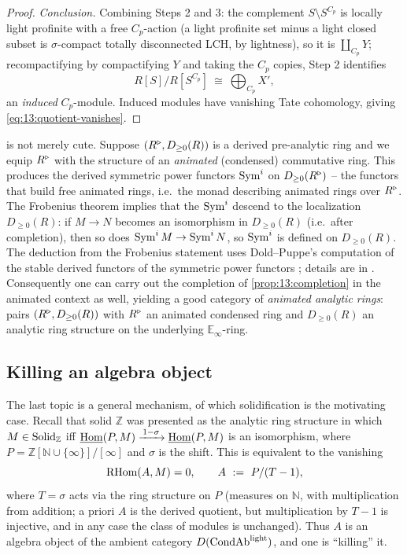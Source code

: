 \begin{proof}
\emph{Conclusion.} Combining Steps 2 and 3: the complement $S\setminus S^{C_p}$ is
locally light profinite with a free $C_p$-action (a light profinite set minus a
light closed subset is $\sigma$-compact totally disconnected LCH, by lightness),
so it is $\coprod_{C_p}Y$; recompactifying by compactifying $Y$ and taking the
$C_p$ copies, Step 2 identifies
\begin{equation*}
R[S]\big/R[S^{C_p}]\ \cong\ \bigoplus_{C_p} X',
\end{equation*}
an \emph{induced} $C_p$-module. Induced modules have vanishing Tate cohomology,
giving \eqref{eq:13:quotient-vanishes}.
\end{proof}

\begin{remark}
\label{rmk:13:symmetric-powers}
 is not merely cute. Suppose $(R^{\triangleright},D_{\ge 0}(R))$ is a
derived pre-analytic ring and we equip $R^{\triangleright}$ with the structure of an
\emph{animated} (condensed) commutative ring. This produces the derived symmetric
power functors $\operatorname{Sym}^i$ on $D_{\ge 0}(R^{\triangleright})$ -- the functors that build free
animated rings, i.e.\ the monad describing animated rings over $R^{\triangleright}$. The
Frobenius theorem implies that the $\operatorname{Sym}^i$ descend to the localization
$D_{\ge 0}(R)$: if $M\to N$ becomes an isomorphism in $D_{\ge 0}(R)$ (i.e.\ after
completion), then so does $\operatorname{Sym}^i M\to\operatorname{Sym}^i N$, so $\operatorname{Sym}^i$ is defined on
$D_{\ge 0}(R)$. The deduction from the Frobenius statement uses Dold--Puppe's
computation of the stable derived functors of the symmetric power functors
\cite{Dold_1961}; details are in \cite{scholze2020analytic}. Consequently one can
carry out the completion of \cref{prop:13:completion} in the animated context as
well, yielding a good category of \emph{animated analytic rings}: pairs
$(R^{\triangleright},D_{\ge 0}(R))$ with $R^{\triangleright}$ an animated condensed ring and $D_{\ge 0}(R)$
an analytic ring structure on the underlying $\mathbb{E}_\infty$-ring.
\end{remark}

\subsection{Killing an algebra object}

The last topic is a general mechanism, of which solidification is the motivating
case. Recall that solid $\mathbb Z$ was presented as the analytic ring structure
in which $M\in\mathrm{Solid}_{\mathbb Z}$ iff
$\underline{\operatorname{Hom}}(P,M)\xrightarrow{\,1-\sigma\,}\underline{\operatorname{Hom}}(P,M)$ is an isomorphism, where
$P=\mathbb Z[\mathbb N\cup\{\infty\}]/[\infty]$ and $\sigma$ is the shift. This is
equivalent to the vanishing
\begin{equation*}
\mathrm{RHom}(A,M)=0,\qquad A\ :=\ P/(T-1),
\end{equation*}
where $T=\sigma$ acts via the ring structure on $P$ (measures on $\mathbb N$, with
multiplication from addition; a priori $A$ is the derived quotient, but
multiplication by $T-1$ is injective, and in any case the class of modules is
unchanged). Thus $A$ is an algebra object of the ambient category
$D(\mathrm{CondAb}^{\mathrm{light}})$, and one is ``killing'' it.

